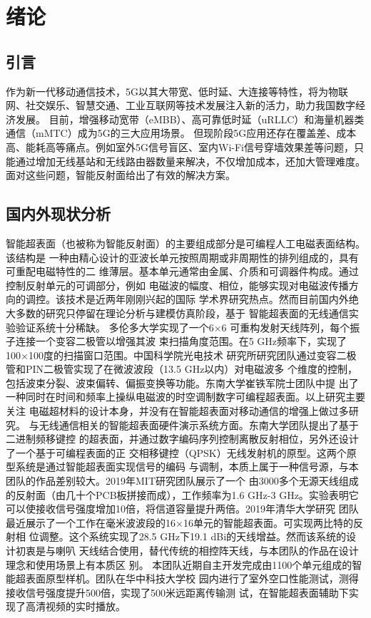 \documentclass[supercite]{HustGraduPaper}
\begin{document}
\clearpage%

\section{绪论}

\subsection{引言}

作为新一代移动通信技术，5G以其大带宽、低时延、大连接等特性，将为物联网、社交娱乐、智慧交通、工业互联网等技术发展注入新的活力，助力我国数字经济发展。
目前，增强移动宽带（eMBB）、高可靠低时延（uRLLC）和海量机器类通信（mMTC）成为5G的三大应用场景。
但现阶段5G应用还存在覆盖差、成本高、能耗高等痛点。例如室外5G信号盲区、室内Wi-Fi信号穿墙效果差等问题，只能通过增加无线基站和无线路由器数量来解决，不仅增加成本，还加大管理难度。
面对这些问题，智能反射面给出了有效的解决方案。

\subsection{国内外现状分析}
智能超表面（也被称为智能反射面）的主要组成部分是可编程人工电磁表面结构。该结构是
一种由精心设计的亚波长单元按照周期或非周期性的排列组成的，具有可重配电磁特性的二
维薄层。基本单元通常由金属、介质和可调器件构成。通过控制反射单元的可调部分，例如
电磁波的幅度、相位，能够实现对电磁波传播方向的调控。该技术是近两年刚刚兴起的国际
学术界研究热点。然而目前国内外绝大多数的研究只停留在理论分析与建模仿真阶段，基于
智能超表面的无线通信实验验证系统十分稀缺。
多伦多大学实现了一个6×6 可重构发射天线阵列，每个振子连接一个变容二极管以增强其波
束扫描角度范围。在5 GHz频率下，实现了100×100度的扫描窗口范围。中国科学院光电技术
研究所研究团队通过变容二极管和PIN二极管实现了在微波波段（13.5 GHz以内）对电磁波多
个维度的控制，包括波束分裂、波束偏转、偏振变换等功能。东南大学崔铁军院士团队中提
出了一种同时在时间和频率上操纵电磁波的时空调制数字可编程超表面。以上研究主要关注
电磁超材料的设计本身，并没有在智能超表面对移动通信的增强上做过多研究。
与无线通信相关的智能超表面硬件演示系统方面。东南大学团队提出了基于二进制频移键控
的超表面，并通过数字编码序列控制离散反射相位，另外还设计了一个基于可编程表面的正
交相移键控（QPSK）无线发射机的原型。这两个原型系统是通过智能超表面实现信号的编码
与调制，本质上属于一种信号源，与本团队的作品差别较大。2019年MIT研究团队展示了一个
由3000多个无源天线组成的反射面（由几十个PCB板拼接而成），工作频率为1.6 GHz-3
GHz。实验表明它可以使接收信号强度增加10倍，将信道容量提升两倍。2019年清华大学研究
团队最近展示了一个工作在毫米波波段的16×16单元的智能超表面。可实现两比特的反射相
位调整。这个系统实现了28.5 GHz下19.1 dBi的天线增益。然而该系统的设计初衷是与喇叭
天线结合使用，替代传统的相控阵天线，与本团队的作品在设计理念和使用场景上有本质区
别。
本团队近期自主开发完成由1100个单元组成的智能超表面原型样机。团队在华中科技大学校
园内进行了室外空口性能测试，测得接收信号强度提升500倍，实现了500米远距离传输测
试，在智能超表面辅助下实现了高清视频的实时播放。
\end{document}
